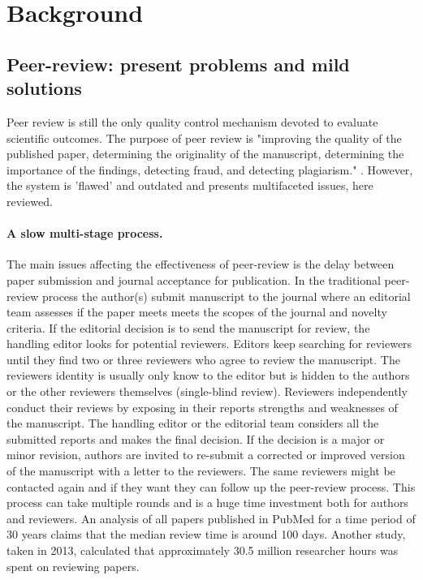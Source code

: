 \documentclass[runningheads]{llncs}
\begin{document}
\section{Background}
\subsection{Peer-review: present problems and mild solutions}
Peer review is still the only quality control mechanism devoted to evaluate scientific outcomes. The purpose of peer review is "improving the quality of the published paper, determining the originality of the manuscript, determining the importance of the findings, detecting fraud, and detecting plagiarism." \cite{Gropp-PeerRevStress}. However, the system is 'ﬂawed' and outdated \cite{Smith2006} and presents multifaceted issues, here reviewed.
\paragraph{A slow multi-stage process.} The main issues affecting the effectiveness of peer-review is the delay between paper submission and journal acceptance for publication. In the traditional peer-review process the author(s) submit manuscript to the journal where an editorial team assesses if the paper meets meets the scopes of the journal and novelty criteria. If the editorial decision is to send the manuscript for review, the handling editor looks for potential reviewers. Editors keep searching for reviewers until they find two or three reviewers who agree to review the manuscript. The reviewers identity is usually only know to the editor but is hidden to the authors or the other reviewers themselves (single-blind review). Reviewers independently conduct their reviews by exposing in their reports strengths and weaknesses of the manuscript. The handling editor or the editorial team considers all the submitted reports and makes the final decision. If the decision is a major or minor revision, authors are invited to re-submit a corrected or improved version of the manuscript with a letter to the reviewers. The same reviewers might be contacted again and if they want they can follow up the peer-review process. This process can take multiple rounds and is a huge time investment both for authors and reviewers. An analysis of all papers published in PubMed for a time period of 30 years claims that the median review time is around 100 days\cite{Kendall-peerrev}. Another study, taken in 2013, calculated that approximately 30.5 million researcher hours was spent on reviewing papers.
\end{document}
